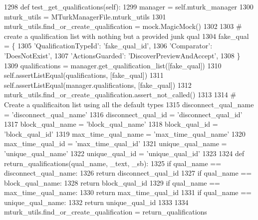 \begin{DoxyCode}
1298     \textcolor{keyword}{def }test\_get\_qualifications(self):
1299         manager = self.mturk\_manager
1300         mturk\_utils = MTurkManagerFile.mturk\_utils
1301         mturk\_utils.find\_or\_create\_qualification = mock.MagicMock()
1302 
1303         \textcolor{comment}{# create a qualification list with nothing but a provided junk qual}
1304         fake\_qual = \{
1305             \textcolor{stringliteral}{'QualificationTypeId'}: \textcolor{stringliteral}{'fake\_qual\_id'},
1306             \textcolor{stringliteral}{'Comparator'}: \textcolor{stringliteral}{'DoesNotExist'},
1307             \textcolor{stringliteral}{'ActionsGuarded'}: \textcolor{stringliteral}{'DiscoverPreviewAndAccept'},
1308         \}
1309         qualifications = manager.get\_qualification\_list([fake\_qual])
1310         self.assertListEqual(qualifications, [fake\_qual])
1311         self.assertListEqual(manager.qualifications, [fake\_qual])
1312         mturk\_utils.find\_or\_create\_qualification.assert\_not\_called()
1313 
1314         \textcolor{comment}{# Create a qualificaiton list using all the default types}
1315         disconnect\_qual\_name = \textcolor{stringliteral}{'disconnect\_qual\_name'}
1316         disconnect\_qual\_id = \textcolor{stringliteral}{'disconnect\_qual\_id'}
1317         block\_qual\_name = \textcolor{stringliteral}{'block\_qual\_name'}
1318         block\_qual\_id = \textcolor{stringliteral}{'block\_qual\_id'}
1319         max\_time\_qual\_name = \textcolor{stringliteral}{'max\_time\_qual\_name'}
1320         max\_time\_qual\_id = \textcolor{stringliteral}{'max\_time\_qual\_id'}
1321         unique\_qual\_name = \textcolor{stringliteral}{'unique\_qual\_name'}
1322         unique\_qual\_id = \textcolor{stringliteral}{'unique\_qual\_id'}
1323 
1324         \textcolor{keyword}{def }return\_qualifications(qual\_name, \_text, \_sb):
1325             \textcolor{keywordflow}{if} qual\_name == disconnect\_qual\_name:
1326                 \textcolor{keywordflow}{return} disconnect\_qual\_id
1327             \textcolor{keywordflow}{if} qual\_name == block\_qual\_name:
1328                 \textcolor{keywordflow}{return} block\_qual\_id
1329             \textcolor{keywordflow}{if} qual\_name == max\_time\_qual\_name:
1330                 \textcolor{keywordflow}{return} max\_time\_qual\_id
1331             \textcolor{keywordflow}{if} qual\_name == unique\_qual\_name:
1332                 \textcolor{keywordflow}{return} unique\_qual\_id
1333 
1334         mturk\_utils.find\_or\_create\_qualification = return\_qualifications

\end{DoxyCode}
